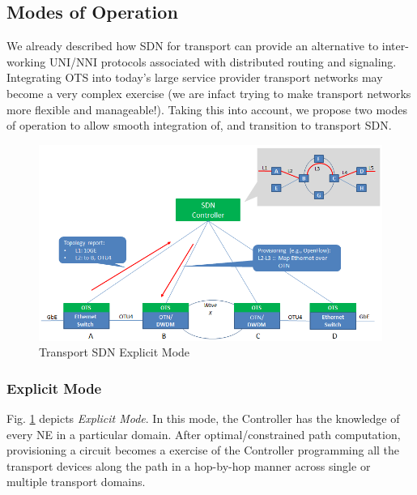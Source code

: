 \documentclass{sig-alternate-2013}
\begin{document}
	\vfill\eject
	\subsection{Modes of Operation} \label{sec:modes}
	We already described how SDN for transport can provide an alternative to inter-working UNI/NNI 
	protocols associated with distributed routing and signaling. Integrating OTS into today's large service provider transport
	networks may become a very complex exercise (we are infact trying to make transport networks more
	flexible and manageable!). Taking this into account, we propose two modes of operation to allow smooth
	integration of, and transition to transport SDN.

	\begin{figure}[htb]
	\centering
	\includegraphics[scale=0.37]{OTSExplicit.png}
	\caption{Transport SDN Explicit Mode}
	\label{fig:OTSExplicit}
	\end{figure}


 \subsubsection{Explicit Mode}
 Fig. \ref{fig:OTSExplicit} depicts \textit{Explicit Mode}. In this mode, the Controller has the knowledge
 of every NE in a particular domain. After optimal/constrained path computation, provisioning a circuit becomes a
 exercise of the Controller programming all the transport devices along the path in a hop-by-hop
 manner across single or multiple transport domains.
 
\end{document}
